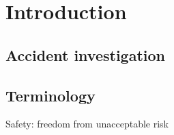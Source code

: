 










\chapter{Introduction}

\section{Accident investigation}


\section{Terminology}
Safety: freedom from unacceptable risk


